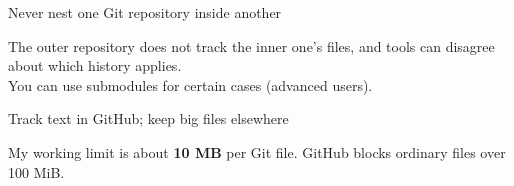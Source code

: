 \begin{frame}{Never nest one Git repository inside another}
  \vfill
  \begin{center}
    \resizebox{0.94\linewidth}{!}{}
  \end{center}
  \vspace{0.9em}
  \begin{center}\small
    The outer repository does not track the inner one's files, and tools can disagree about which history applies.\\[0.5em]
    You can use submodules for certain cases (advanced users).
  \end{center}
  \vspace{1.2cm plus 1fill}
\end{frame}
\begin{frame}{Track text in GitHub; keep big files elsewhere}
  \vfill
  \begin{center}
    \resizebox{0.86\linewidth}{!}{}
  \end{center}
  \vspace{0.6em}
  \begin{center}\small
    My working limit is about \textbf{10 MB} per Git file. GitHub blocks ordinary files over 100 MiB.
  \end{center}
  \vspace{1.6cm plus 1fill}
\end{frame}

